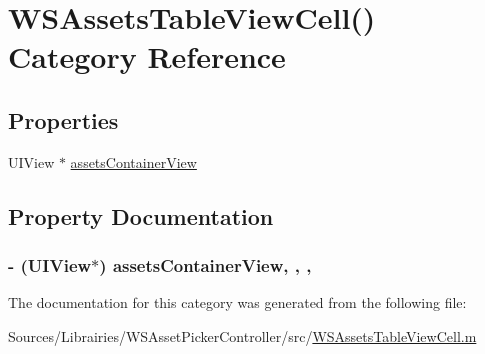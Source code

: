 \hypertarget{category_w_s_assets_table_view_cell_07_08}{\section{W\-S\-Assets\-Table\-View\-Cell() Category Reference}
\label{category_w_s_assets_table_view_cell_07_08}
}
\subsection*{Properties}
\begin{DoxyCompactItemize}
\item 
U\-I\-View $\ast$ \hyperlink{category_w_s_assets_table_view_cell_07_08_a9a2533422e502e5d892ed40a4c56e9ee}{assets\-Container\-View}
\end{DoxyCompactItemize}


\subsection{Property Documentation}
\hypertarget{category_w_s_assets_table_view_cell_07_08_a9a2533422e502e5d892ed40a4c56e9ee}{
\subsubsection[{assets\-Container\-View}]{\setlength{\rightskip}{0pt plus 5cm}-\/ (U\-I\-View$\ast$) assets\-Container\-View\hspace{0.3cm}{\ttfamily [read]}, {\ttfamily [write]}, {\ttfamily [nonatomic]}, {\ttfamily [strong]}}}\label{category_w_s_assets_table_view_cell_07_08_a9a2533422e502e5d892ed40a4c56e9ee}


The documentation for this category was generated from the following file\-:\begin{DoxyCompactItemize}
\item 
Sources/\-Librairies/\-W\-S\-Asset\-Picker\-Controller/src/\hyperlink{_w_s_assets_table_view_cell_8m}{W\-S\-Assets\-Table\-View\-Cell.\-m}\end{DoxyCompactItemize}
